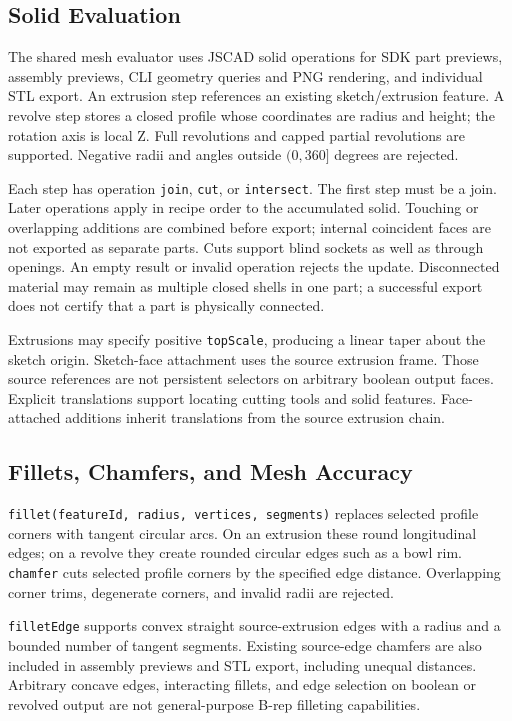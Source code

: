 \documentclass[11pt]{article}
\newcommand{\Type}[1]{\texttt{#1}}
\begin{document}
\subsection{Solid Evaluation}

The shared mesh evaluator uses JSCAD solid operations for SDK part previews,
assembly previews, CLI geometry queries and PNG rendering, and individual STL export. An extrusion step references an
existing sketch/extrusion feature. A revolve step stores a closed profile whose
coordinates are radius and height; the rotation axis is local Z.
Full revolutions and capped partial revolutions are supported. Negative radii
and angles outside $(0,360]$ degrees are rejected.

Each step has operation \Type{join}, \Type{cut}, or \Type{intersect}.
The first step must be a join. Later operations apply in recipe order to the
accumulated solid. Touching or overlapping additions are combined before export;
internal coincident faces are not exported as separate parts. Cuts support blind
sockets as well as through openings. An empty result or invalid operation rejects
the update. Disconnected material may remain as multiple closed shells in one
part; a successful export does not certify that a part is physically connected.

Extrusions may specify positive \Type{topScale}, producing a linear taper about
the sketch origin. Sketch-face attachment uses the source extrusion frame.
Those source references are not persistent selectors on arbitrary boolean output
faces. Explicit translations support locating cutting tools and solid features.
Face-attached additions inherit translations from the source extrusion chain.

\subsection{Fillets, Chamfers, and Mesh Accuracy}

\Type{fillet(featureId, radius, vertices, segments)} replaces selected profile
corners with tangent circular arcs. On an extrusion these round longitudinal
edges; on a revolve they create rounded circular edges such as a bowl rim.
\Type{chamfer} cuts selected profile corners by the specified edge distance.
Overlapping corner trims, degenerate corners, and invalid radii are rejected.

\Type{filletEdge} supports convex straight source-extrusion edges with a radius
and a bounded number of tangent segments. Existing source-edge chamfers are also
included in assembly previews and STL export, including unequal distances.
Arbitrary concave edges, interacting fillets, and edge selection on boolean or
revolved output are not general-purpose B-rep filleting capabilities.
\end{document}
